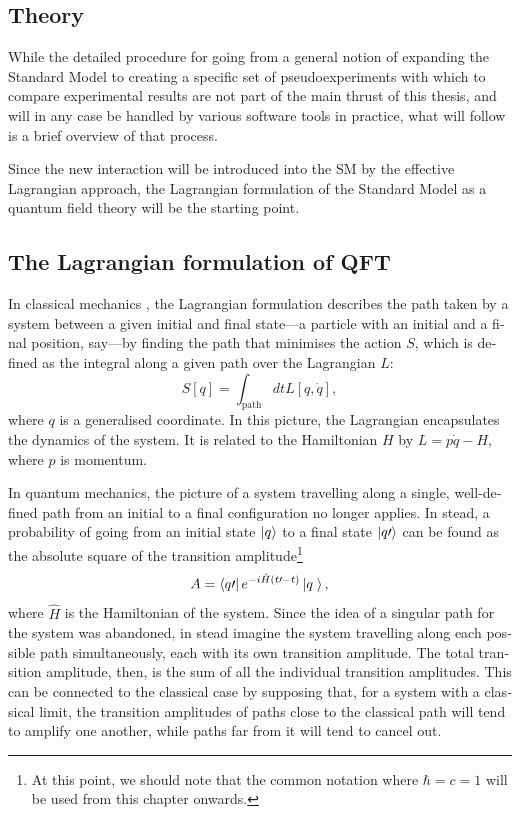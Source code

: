 \begin{english}
\chapter{Theory}

While the detailed procedure for going from a general notion of expanding the Standard Model to creating a specific set of pseudoexperiments with which to compare experimental results are not part of the main thrust of this thesis, and will in any case be handled by various software tools in practice, what will follow is a brief overview of that process.

Since the new interaction will be introduced into the SM by the effective Lagrangian approach, the Lagrangian formulation of the Standard Model as a quantum field theory will be the starting point.

\section{The Lagrangian formulation of QFT}
In classical mechanics \cite{goldstein}, the Lagrangian formulation describes the path taken by a system between a given initial and final state---a particle with an initial and a final position, say---by finding the path that minimises the action $S$, which is defined as the integral along a given path over the Lagrangian $L$:
\[S[q]=\int_\textrm{path}dtL[q,\dot{q}],\]
where $q$ is a generalised coordinate. In this picture, the Lagrangian encapsulates the dynamics of the system. It is related to the Hamiltonian $H$ by
\(L = p\dot q- H,\label{htol}\)
where $p$ is momentum.

In quantum mechanics, the picture of a system travelling along a single, well-defined path from an initial to a final configuration no longer applies. In stead, a probability of going from an initial state $\left| q \right\rangle$ to a final state $\left| q\prime \right\rangle$ can be found as the absolute square of the transition amplitude\footnote{At this point, we should note that the common notation where $\hbar = c = 1$ will be used from this chapter onwards.} \cite{sred:tramp}
\[A=\bra{q\prime}e^{-i\hat H(t\prime-t)}\ket{q\phantom\prime},\]
where $\hat H$ is the Hamiltonian of the system. Since the idea of a singular path for the system was abandoned, in stead imagine the system travelling along each possible path simultaneously, each with its own transition amplitude. The total transition amplitude, then, is the sum of all the individual transition amplitudes. This can be connected to the classical case by supposing that, for a system with a classical limit, the transition amplitudes of paths close to the classical path will tend to amplify one another, while paths far from it will tend to cancel out.


\end{english}
